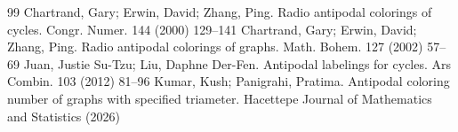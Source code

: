 \documentclass[10pt,a4paper]{amsart}
\begin{document}
\begin{thebibliography}{99}
 Chartrand, Gary; Erwin, David; Zhang, Ping. Radio antipodal colorings of cycles. Congr. Numer. 144 (2000) 129--141
 Chartrand, Gary; Erwin, David; Zhang, Ping. Radio antipodal colorings of graphs. Math. Bohem. 127 (2002) 57--69
 Juan, Justie Su-Tzu; Liu, Daphne Der-Fen. Antipodal labelings for cycles. Ars Combin. 103 (2012) 81--96
 Kumar, Kush; Panigrahi, Pratima. Antipodal coloring number of graphs with specified triameter. Hacettepe Journal of Mathematics and Statistics (2026)
\end{thebibliography}
\end{document}
